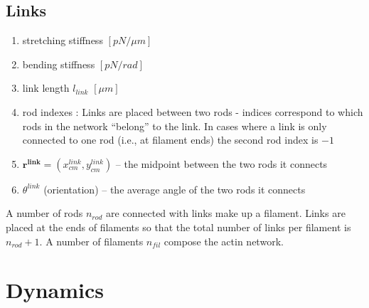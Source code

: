 \documentclass[11pt]{article}
\begin{document}
\subsection{Links}
\begin{enumerate}
  \item stretching stiffness $\left[pN/\mu m\right]$
  \item bending stiffness $\left[pN/rad\right]$
  \item link length $l_{link}$ $\left[\mu m\right]$
  \item rod indexes : Links are placed between two rods - indices correspond to which rods in the network ``belong'' to
    the link. In cases where a link is only connected to one rod (i.e., at filament ends) the second rod index is $-1$
  \item  $\mathbf{r^{link}}=(x^{link}_{cm},y^{link}_{cm})$ -- the midpoint between the two rods it
    connects
  \item $\theta^{link}$ (orientation) -- the average angle of the two rods it connects
\end{enumerate}
A number of rods $n_{rod}$ are connected with links make up a filament. Links are placed at the ends of filaments so
that the total number of links per filament is $n_{rod} + 1$. A number of filaments $n_ {fil}$ compose the actin network.
\section{Dynamics} 
\end{document}
